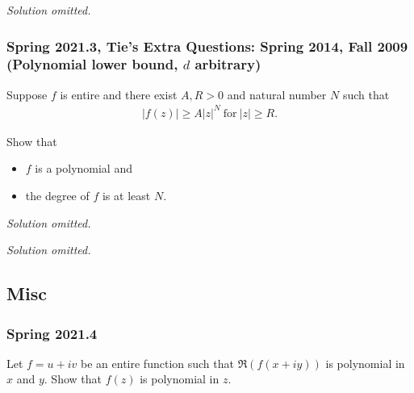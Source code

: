 \emph{Solution omitted.}

\hypertarget{spring-2021.3-ties-extra-questions-spring-2014-fall-2009-polynomial-lower-bound-d-arbitrary}{%
\subsubsection{\texorpdfstring{Spring 2021.3, Tie's Extra Questions:
Spring 2014, Fall 2009 (Polynomial lower bound, \(d\)
arbitrary)}{Spring 2021.3, Tie's Extra Questions: Spring 2014, Fall 2009 (Polynomial lower bound, d arbitrary)}}\label{spring-2021.3-ties-extra-questions-spring-2014-fall-2009-polynomial-lower-bound-d-arbitrary}}

\begin{problem}[?]

Suppose \(f\) is entire and there exist \(A, R >0\) and natural number
\(N\) such that
\begin{align*}
|f(z)| \geq A |z|^N\ \text{for}\ |z| \geq R
.\end{align*}

Show that

\begin{itemize}
\tightlist
\item
  \(f\) is a polynomial and
\item
  the degree of \(f\) is at least \(N\).
\end{itemize}

\end{problem}

\emph{Solution omitted.}

\emph{Solution omitted.}

\hypertarget{misc}{%
\subsection{Misc}\label{misc}}

\hypertarget{spring-2021.4}{%
\subsubsection{Spring 2021.4}\label{spring-2021.4}}

\begin{problem}[?]

Let \(f = u + iv\) be an entire function such that \(\Re(f(x+iy))\) is
polynomial in \(x\) and \(y\). Show that \(f(z)\) is polynomial in
\(z\).

\end{problem}


